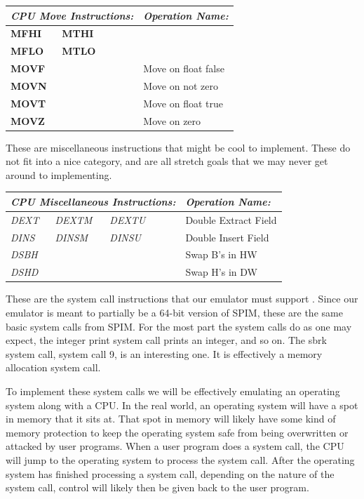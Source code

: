 \documentclass[
    paper=letter,
    parskip=half,
    fontsize=12pt,
    titlepage=firstiscover,
    toc=bibliography,
    numbers=endperiod
]{scrartcl}
\begin{document}
\begin{tabularx}{\textwidth}{lllll|X}
    \multicolumn{5}{l|}{\emph{CPU Move Instructions:}} & \emph{Operation Name:}  \\ \hline
    \textbf{MFHI} & \textbf{MTHI} &  &  &              &                         \\
    \textbf{MFLO} & \textbf{MTLO} &  &  &              &                         \\
    \textbf{MOVF} &               &  &  &              & Move on float false     \\
    \textbf{MOVN} &               &  &  &              & Move on not zero        \\
    \textbf{MOVT} &               &  &  &              & Move on float true      \\
    \textbf{MOVZ} &               &  &  &              & Move on zero
\end{tabularx}

These are miscellaneous instructions that might be cool to implement.
These do not fit into a nice category, and are all stretch goals that we
may never get around to implementing.

\begin{tabularx}{\textwidth}{lllll|X}
    \multicolumn{5}{l|}{\emph{CPU Miscellaneous Instructions:}} & \emph{Operation Name:}  \\ \hline
    \emph{DEXT} & \emph{DEXTM} & \emph{DEXTU} &  &              & Double Extract Field    \\
    \emph{DINS} & \emph{DINSM} & \emph{DINSU} &  &              & Double Insert Field     \\
    \emph{DSBH} &              &              &  &              & Swap B's in HW          \\
    \emph{DSHD} &              &              &  &              & Swap H's in DW
\end{tabularx}

These are the system call instructions that our emulator must support \cite{spim-system-calls}.
Since our emulator is meant to partially be a 64-bit version of SPIM,
these are the same basic system calls from SPIM. For the most part the
system calls do as one may expect, the integer print system call prints
an integer, and so on. The sbrk system call, system call 9, is an
interesting one. It is effectively a memory allocation system call.

To implement these system calls we will be effectively emulating an
operating system along with a CPU. In the real world, an operating
system will have a spot in memory that it sits at. That spot in memory
will likely have some kind of memory protection to keep the operating
system safe from being overwritten or attacked by user programs. When a
user program does a system call, the CPU will jump to the operating
system to process the system call. After the operating system has
finished processing a system call, depending on the nature of the system
call, control will likely then be given back to the user program.
\end{document}
